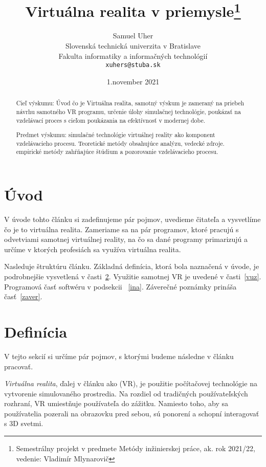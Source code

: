 \documentclass[10pt,twoside,slovak,a4paper]{article}
\title{Virtuálna realita v priemysle\thanks{Semestrálny projekt v predmete Metódy inžinierskej práce, ak. rok 2021/22, vedenie: Vladimír Mlynarovič}} %
\author{Samuel Uher\\[2pt]
	{\small Slovenská technická univerzita v Bratislave}\\
	{\small Fakulta informatiky a informačných technológií}\\
	{\small \texttt{xuhers@stuba.sk}}
	}
\date{\small 1.november 2021} %
\begin{document}
\maketitle

\begin{abstract}
Cieľ výskumu: Úvod čo je Virtuálna realita, samotný výskum je zameraný na priebeh návrhu samotného VR programu, 
určenie úlohy simulačnej technológie, poukázať na vzdelávací proces s cieľom poukázania 
na efektívnosť v modernej dobe.\vspace{5mm}

Predmet výskumu: simulačné technológie virtuálnej reality ako komponent
vzdelávacieho procesu. Teoretické metódy obsahujúce analýzu, 
vedecké zdroje. empirické metódy zahŕňajúce štúdium a pozorovanie
vzdelávacieho procesu. 


\end{abstract}



\section{Úvod}
V úvode tohto článku si zadefinujeme pár pojmov, uvedieme čitateľa a vysvetlíme čo je to virtuálna realita. Zameriame sa na pár programov, 
ktoré pracujú s odvetviami samotnej virtuálnej reality, na čo sa dané programy primarizujú a určíme v ktorých profesiách sa využíva virtuálna realita.\vspace{5mm}

Nasleduje štruktúru článku. Základná definícia, ktorá bola naznačená v úvode, je podrobnejšie vysvetlená v časti~\ref{def}.
Využitie samotnej VR je uvedené v časti~\ref{vuz}. Programová časť softwéru v podsekcii ~\ref{ina}.
Záverečné poznámky prináša časť~\ref{zaver}.



\section{Definícia} \label{def}
V tejto sekcií si určíme pár pojmov, s ktorými budeme následne v článku pracovať.
\vspace{25mm}

\emph{Virtuálna realita}, ďalej v článku ako (VR), je použitie počítačovej technológie na vytvorenie simulovaného prostredia. Na rozdiel od tradičných používateľských rozhraní, VR umiestňuje používateľa do zážitku. Namiesto toho, aby sa používatelia pozerali na obrazovku pred sebou, sú ponorení a schopní interagovať s 3D svetmi.\vspace{5mm}\cite{joebardie_2020}
\end{document}
